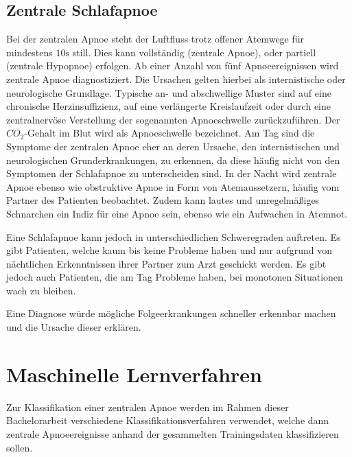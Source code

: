 \subsection{Zentrale Schlafapnoe}
\label{ch:Basics:se:apnoe}
Bei der zentralen Apnoe steht der Luftfluss trotz offener Atemwege für mindestens $10\si{\s}$ still. 
Dies kann vollständig (zentrale Apnoe), oder partiell (zentrale Hypopnoe) erfolgen. 
Ab einer Anzahl von fünf Apnoeereignissen wird zentrale Apnoe diagnostiziert.
Die Ursachen gelten hierbei als internistische oder neurologische Grundlage.
Typische an- und abschwellige Muster sind auf eine chronische Herzinsuffizienz, auf eine verlängerte Kreislaufzeit oder durch eine zentralnervöse Verstellung der sogenannten Apnoeschwelle zurückzuführen.
Der $CO_2$-Gehalt im Blut wird als Apnoeschwelle bezeichnet.
Am Tag sind die Symptome der zentralen Apnoe eher an deren Ursache, den internistischen und neurologischen Grunderkrankungen, zu erkennen, da diese häufig nicht von den Symptomen der Schlafapnoe zu unterscheiden sind. 
In der Nacht wird zentrale Apnoe ebenso wie obstruktive Apnoe in Form von Atemaussetzern, häufig vom Partner des Patienten beobachtet.
Zudem kann lautes und unregelmäßiges Schnarchen ein Indiz für eine Apnoe sein, ebenso wie ein Aufwachen in Atemnot.

Eine Schlafapnoe kann jedoch in unterschiedlichen Schweregraden auftreten. 
Es gibt Patienten, welche kaum bis keine Probleme haben und nur aufgrund von nächtlichen Erkenntnissen ihrer Partner zum Arzt geschickt werden. 
Es gibt jedoch auch Patienten, die am Tag Probleme haben, bei monotonen Situationen wach zu bleiben.

Eine Diagnose würde mögliche Folgeerkrankungen schneller erkennbar machen und die Ursache dieser erklären.

\section{Maschinelle Lernverfahren}
\label{ch:Basics:se:ml}
Zur Klassifikation einer zentralen Apnoe werden im Rahmen dieser Bachelorarbeit verschiedene Klassifikationsverfahren verwendet, welche dann zentrale Apnoeereignisse anhand der gesammelten Trainingsdaten klassifizieren sollen.

